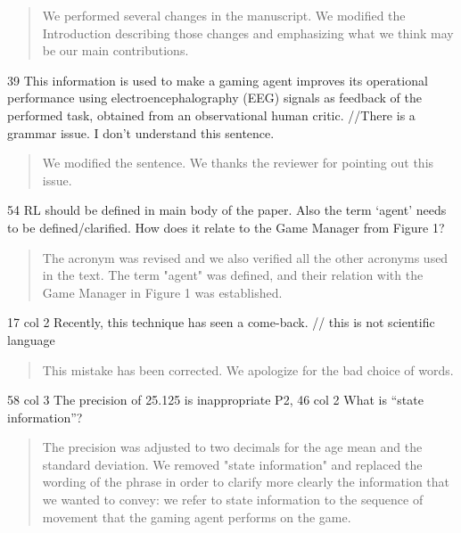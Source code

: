 \documentclass[journal,onecolumn,12pt]{IEEEtran}
\begin{document}
\vspace{2em}
\begin{quotation}
{\color{blue}
We performed several changes in the manuscript.  We modified the Introduction describing those changes and emphasizing what we think may be our main contributions.
}
\end{quotation}
\vspace{2em}

39 This information is used to make a gaming agent improves its operational performance using electroencephalography (EEG) signals as feedback of the performed task, obtained from an observational human critic.
//There is a grammar issue. I don’t understand this sentence.

\vspace{2em}
\begin{quotation}
{\color{blue}
We modified the sentence.  We thanks the reviewer for pointing out this issue.
}
\end{quotation}
\vspace{2em}

54 RL should be defined in main body of the paper. Also the term ‘agent’ needs to be defined/clarified. How does it relate to the Game Manager from Figure 1?

\vspace{2em}
\begin{quotation}
{\color{blue}
The acronym was revised and we also verified all the other acronyms used in the text.  The term "agent" was defined, and their relation with the Game Manager in Figure 1 was established.
}
\end{quotation}
\vspace{2em}

17 col 2 Recently, this technique has seen a come-back. // this is not scientific language

\vspace{2em}
\begin{quotation}
{\color{blue}
This mistake has been corrected.  We apologize for the bad choice of words.
}
\end{quotation}
\vspace{2em}

58 col 3 The precision of 25.125 is inappropriate P2, 46 col 2 What is “state information”?

\vspace{2em}
\begin{quotation}
{\color{blue}
The precision was adjusted to two decimals for the age mean and the standard deviation.  We removed  "state information" and replaced the wording of the phrase in order to clarify more clearly the information that we wanted to convey:  we refer to state information to the sequence of movement that the gaming agent performs on the game.
}
\end{quotation}
\vspace{2em}
\end{document}
